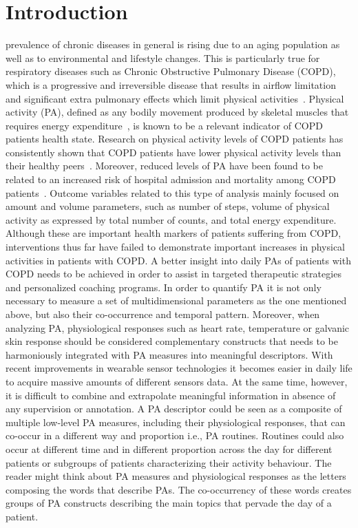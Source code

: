 \section{Introduction}

 prevalence of chronic diseases in general is rising due to an aging population as well as to  environmental and lifestyle changes.  This is particularly true for respiratory diseases such as Chronic Obstructive Pulmonary Disease (COPD), which is a progressive and irreversible disease that results in airflow limitation and significant extra pulmonary effects which limit physical activities~\cite{Seymour_2009, Verboom_2011}. 
Physical activity (PA), defined as any bodily  movement produced by skeletal muscles that requires energy expenditure~\cite{Caspersen_1985}, is known to be a relevant indicator of COPD patients health state. Research on  physical activity levels of COPD patients has consistently shown that COPD patients have lower physical activity levels than their healthy peers~\cite{Vorrink_2011}. Moreover, reduced levels of PA have been found to be related to an increased risk of hospital admission and mortality among COPD patients~\cite{Garcia_2006, Pitta_2006, Waschki_2011}. Outcome variables related to this type of analysis mainly focused on amount and volume parameters, such as
number of steps, volume of physical activity as expressed by total 
number of counts, and total energy expenditure. Although these are important health markers of patients suffering from COPD, interventions thus far have failed to demonstrate important increases in physical activities in patients with COPD. A better insight into daily PAs of patients with COPD needs to be achieved in order to assist in targeted therapeutic strategies and personalized coaching programs. In order to quantify PA it is not only necessary to measure a set of multidimensional parameters as the one mentioned above, but also their co-occurrence and temporal pattern. Moreover, when analyzing PA, physiological responses such as heart rate, temperature or galvanic skin response should be considered complementary constructs that needs to be harmoniously integrated with PA measures into meaningful descriptors.
With recent improvements in wearable sensor technologies it becomes easier in daily life to acquire massive amounts of different sensors data. At the same time, however, it is difficult to combine and extrapolate meaningful information in absence of any supervision or annotation.
A PA descriptor could be seen as a composite of multiple low-level PA measures, including their physiological responses, that can co-occur in a different way and proportion i.e., PA routines. Routines could also occur at different time and in different proportion across the day for different patients or subgroups of patients characterizing their activity behaviour. The reader might think about PA measures and physiological responses as the letters composing the words that describe PAs. The co-occurrency of these words creates groups of PA constructs describing the main topics that pervade the day of a patient. 
